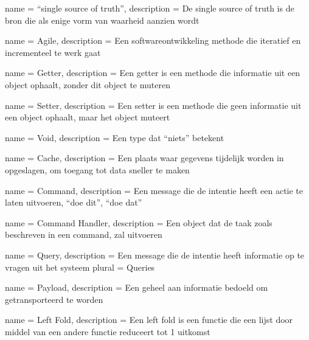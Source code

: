 {
  name = ``single source of truth'',
  description = {De single source of truth is de bron die als enige vorm van waarheid aanzien wordt}
}

{
  name = Agile,
  description = {Een softwareontwikkeling methode die iteratief en incrementeel te werk gaat}
}

{
  name = Getter,
  description = {Een getter is een methode die informatie uit een object ophaalt, zonder dit object te muteren}
}

{
  name = Setter,
  description = {Een setter is een methode die geen informatie uit een object ophaalt, maar het object muteert}
}

{
  name = Void,
  description = {Een type dat ``niets'' betekent}
}

{
  name = Cache,
  description = {Een plaats waar gegevens tijdelijk worden in opgeslagen, om toegang tot data sneller te maken}
}

{
  name = Command,
  description = {Een message die de intentie heeft een actie te laten uitvoeren, ``doe dit'', ``doe dat''}
}

{
  name = {Command Handler},
  description = {Een object dat de taak zoals beschreven in een command, zal uitvoeren}
}

{
  name = Query,
  description = {Een message die de intentie heeft informatie op te vragen uit het systeem}
  plural = Queries
}

{
  name = Payload,
  description = {Een geheel aan informatie bedoeld om getransporteerd te worden}
}

{
  name = {Left Fold},
  description = {Een left fold is een functie die een lijst door middel van een andere functie reduceert tot 1 uitkomst}
}


\printglossary[type=\acronymtype,title={Lijst van acroniemen}]

\printglossary
{}

